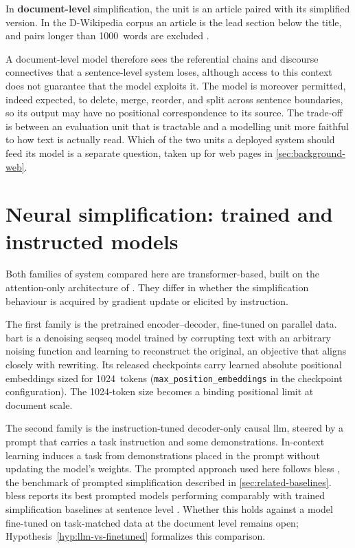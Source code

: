 In \textbf{document-level} simplification, the unit is an article paired with its simplified version.
In the D-Wikipedia corpus an article is the lead section below the title, and pairs longer than \num{1000}~words are excluded \parencite[7999]{sun-etal-2021-document}.

\pagebreak

A document-level model therefore sees the referential chains and discourse connectives that a sentence-level system loses, although access to this context does not guarantee that the model exploits it.
The model is moreover permitted, indeed expected, to delete, merge, reorder, and split across sentence boundaries, so its output may have no positional correspondence to its source.
The trade-off is between an evaluation unit that is tractable and a modelling unit more faithful to how text is actually read.
Which of the two units a deployed system should feed its model is a separate question, taken up for web pages in \cref{sec:background-web}.

\section{Neural simplification: trained and instructed models}
\label{sec:background-models}

Both families of system compared here are transformer-based, built on the attention-only architecture of \textcite[1]{vaswani2023attentionneed}.
They differ in whether the simplification behaviour is acquired by gradient update or elicited by instruction.

The first family is the pretrained encoder--decoder, fine-tuned on parallel data.
\Gls{bart} \parencite[7871]{lewis-etal-2020-bart} is a denoising \gls{seqseq} model trained by corrupting text with an arbitrary noising function and learning to reconstruct the original, an objective that aligns closely with rewriting.
Its released checkpoints carry learned absolute positional embeddings sized for \num{1024}~tokens (\texttt{max\_position\_embeddings} in the checkpoint configuration).
The \num{1024}-token size becomes a binding positional limit at document scale.

The second family is the instruction-tuned decoder-only causal \gls{llm}, steered by a prompt that carries a task instruction and some demonstrations.
In-context learning \parencite[1, 3]{brown2020languagemodels} induces a task from demonstrations placed in the prompt without updating the model's weights.
The prompted approach used here follows \gls{bless} \parencite{kew-etal-2023-bless}, the benchmark of prompted simplification described in \cref{sec:related-baselines}.
\Gls{bless} reports its best prompted models performing comparably with trained simplification baselines at sentence level \parencite[13291]{kew-etal-2023-bless}.
Whether this holds against a model fine-tuned on task-matched data at the document level remains open; Hypothesis~\cref{hyp:llm-vs-finetuned} formalizes this comparison.

